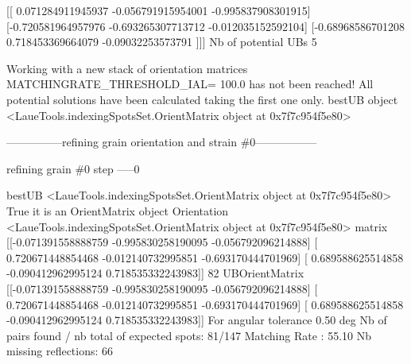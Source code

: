 \documentclass[letterpaper,10pt,english]{sphinxmanual}
\begin{document}
\begin{sphinxalltt}
 {[}{[} 0.071284911945937 -0.056791915954001 -0.995837908301915{]}
  {[}-0.720581964957976 -0.693265307713712 -0.012035152592104{]}
  {[}-0.68968586701208   0.718453369664079 -0.09032253573791 {]}{]}{]}
Nb of potential UBs  5

Working with a new stack of orientation matrices
MATCHINGRATE\_THRESHOLD\_IAL= 100.0
has not been reached! All potential solutions have been calculated
taking the first one only.
bestUB object \textless{}LaueTools.indexingSpotsSet.OrientMatrix object at 0x7f7c954f5e80\textgreater{}


---------------refining grain orientation and strain \#0-----------------


 refining grain \#0 step -----0

bestUB \textless{}LaueTools.indexingSpotsSet.OrientMatrix object at 0x7f7c954f5e80\textgreater{}
True it is an OrientMatrix object
Orientation \textless{}LaueTools.indexingSpotsSet.OrientMatrix object at 0x7f7c954f5e80\textgreater{}
matrix {[}{[}-0.071391558888759 -0.995830258190095 -0.056792096214888{]}
 {[} 0.720671448854468 -0.012140732995851 -0.693170444701969{]}
 {[} 0.689588625514858 -0.090412962995124  0.718535332243983{]}{]}
 82
UBOrientMatrix {[}{[}-0.071391558888759 -0.995830258190095 -0.056792096214888{]}
 {[} 0.720671448854468 -0.012140732995851 -0.693170444701969{]}
 {[} 0.689588625514858 -0.090412962995124  0.718535332243983{]}{]}
For angular tolerance 0.50 deg
Nb of pairs found / nb total of expected spots: 81/147
Matching Rate : 55.10
Nb missing reflections: 66


\end{sphinxalltt}
\end{document}
